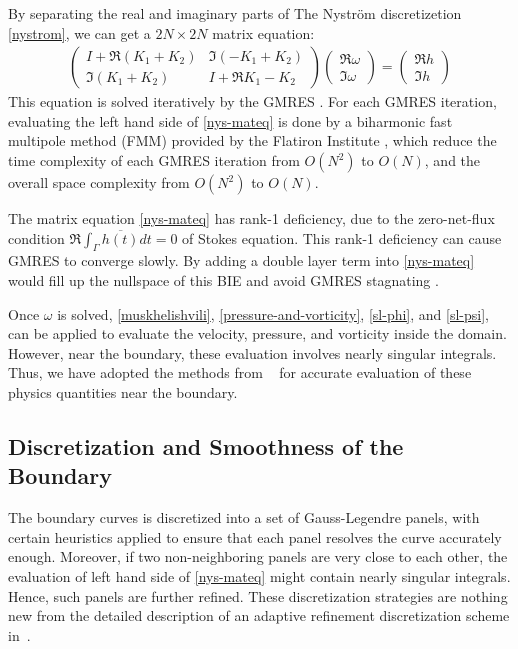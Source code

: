 \documentclass[10pt,twocolumn,letterpaper]{article}
\begin{document}
By separating the real and imaginary parts of The Nystr\"om discretizetion \eqref{nystrom}, we can get a $2N\times 2N$ matrix equation:
\begin{align}
  \begin{pmatrix}
    I + \Re(K_1 + K_2) & \Im(-K_1 + K_2) \\
    \Im(K_1 + K_2) & I + \Re{K_1 - K_2}  
  \end{pmatrix}
  \begin{pmatrix}
    \Re \omega  \\ \Im \omega 
  \end{pmatrix}
  =
  \begin{pmatrix}
    \Re h \\ \Im h
  \end{pmatrix}
  \label{nys-mateq}
\end{align}
This equation is solved iteratively by the GMRES \cite{saadGMRESGeneralizedMinimal1986}.
For each GMRES iteration, evaluating the left hand side of \eqref{nys-mateq}
is done by a biharmonic fast multipole method (FMM) 
provided by the Flatiron Institute \cite{FlatironinstituteFmm2d2022}, 
which reduce the time complexity of each GMRES iteration from $O(N^2)$ to $O(N)$, 
and the overall space complexity from $O(N^2)$ to $O(N)$. 

The matrix equation \eqref{nys-mateq} has rank-1 deficiency, 
due to the zero-net-flux condition $\Re \int_\Gamma \overline{h(t)} dt = 0$ 
of Stokes equation. This rank-1 deficiency can cause GMRES to converge slowly. 
By adding a double layer term into \eqref{nys-mateq} would fill up 
the nullspace of this BIE and avoid GMRES stagnating \cite{zhangFastDirectSolver2022}. 

Once $\omega$ is solved, 
\eqref{muskhelishvili}, \eqref{pressure-and-vorticity}, \eqref{sl-phi}, and \eqref{sl-psi}, 
can be applied to evaluate the velocity, pressure, and vorticity inside the domain. 
However, near the boundary, these evaluation involves nearly singular integrals. 
Thus, we have adopted the methods from
~\cite{wuSolutionStokesFlow2020,helsingEvaluationLayerPotentials2008} 
for accurate evaluation of these physics quantities near the boundary.

\subsection{Discretization and Smoothness of the Boundary}

The boundary curves is discretized into a set of Gauss-Legendre panels, 
with certain heuristics applied to ensure that each panel resolves 
the curve accurately enough. 
Moreover, if two non-neighboring panels are very close to each other, 
the evaluation of left hand side of \eqref{nys-mateq} might contain 
nearly singular integrals. Hence, such panels are further refined. 
These discretization strategies are nothing new from
the detailed description of an adaptive refinement discretization scheme 
in~\cite{wuSolutionStokesFlow2020}.  
\end{document}
